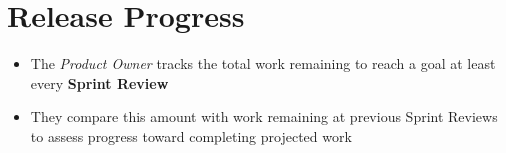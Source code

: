 \documentclass[a4paper,11pt,twocolumn]{article}
\begin{document}
\section*{Release Progress}
\begin{itemize}
	\item The \textit{Product Owner} tracks the total work remaining to reach a goal at least every \textbf{Sprint Review}
	\item They compare this amount with work remaining at previous Sprint Reviews to assess progress toward completing projected work
\end{itemize}

\nocite{*}


\end{document}
